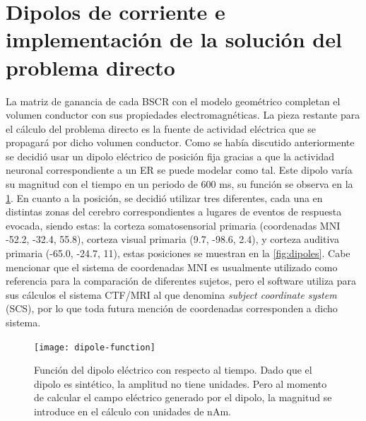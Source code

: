 \section{Dipolos de corriente e implementación de la solución del problema directo}
\label{sec:methodology:direct_solved}

La matriz de ganancia de cada BSCR con el modelo geométrico completan el volumen conductor con sus propiedades electromagnéticas.
La pieza restante para el cálculo del problema directo es la fuente de actividad eléctrica que se propagará por dicho volumen conductor.
Como se había discutido anteriormente se decidió usar un dipolo eléctrico de posición fija gracias a que la actividad neuronal correspondiente a un ER se puede modelar como tal. 
Este dipolo varía su magnitud con el tiempo en un periodo de 600 ms, su función se observa en la \cref{fig:methodology:dipole}.
En cuanto a la posición, se decidió utilizar tres diferentes, cada una en distintas zonas del cerebro correspondientes a lugares de eventos de respuesta evocada, siendo estas: la corteza somatosensorial primaria (coordenadas MNI -52.2, -32.4, 55.8), corteza visual primaria (9.7, -98.6, 2.4), y corteza auditiva primaria (-65.0, -24.7, 11), estas posiciones se muestran en la \cref{fig:dipoles}.
Cabe mencionar que el sistema de coordenadas MNI es usualmente utilizado como referencia para la comparación de diferentes sujetos, pero el software utiliza para sus cálculos el sistema CTF/MRI al que denomina \emph{subject coordinate system} (SCS), por lo que toda futura mención de coordenadas corresponden a dicho sistema.

\begin{figure}[tb]
	\centering
	\texttt{[image: dipole-function]}
	\caption{Función del dipolo eléctrico con respecto al tiempo. Dado que el dipolo es sintético, la amplitud no tiene unidades. Pero al momento de calcular el campo eléctrico generado por el dipolo, la magnitud se introduce en el cálculo con unidades de nAm.}
	\label{fig:methodology:dipole}
\end{figure}


